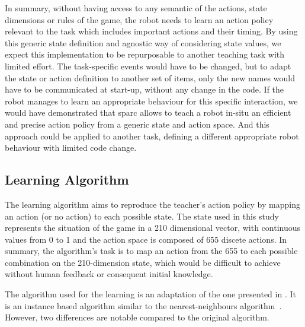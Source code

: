 In summary, without having access to any semantic of the actions, state dimensions or rules of the game, the robot needs to learn an action policy relevant to the task which includes important actions and their timing. By using this generic state definition and agnostic way of considering state values, we expect this implementation to be repurposable to another teaching task with limited effort. The task-specific events would have to be changed, but to adapt the state or action definition to another set of items, only the new names would have to be communicated at start-up, without any change in the code. If the robot manages to learn an appropriate behaviour for this specific interaction, we would have demonstrated that \gls{sparc} allows to teach a robot in-situ an efficient and precise action policy from a generic state and action space. And this approach could be applied to another task, defining a different appropriate robot behaviour with limited code change.





\subsection{Learning Algorithm} \label{sec:tuto_algo}
The learning algorithm aims to reproduce the teacher's action policy by mapping an action (or no action) to each possible state. The state used in this study represents the situation of the game in a 210 dimensional vector, with continuous values from 0 to 1 and the action space is composed of 655 discete actions. In summary, the algorithm's task is to map an action from the 655 to each possible combination on the 210-dimension state, which would be difficult to achieve without human feedback or consequent initial knowledge.

The algorithm used for the learning is an adaptation of the one presented in \cite{senft2017toward}. It is an instance based algorithm similar to the nearest-neighbours algorithm~\citep{cover1967nearest}. However, two differences are notable compared to the original algorithm. %

